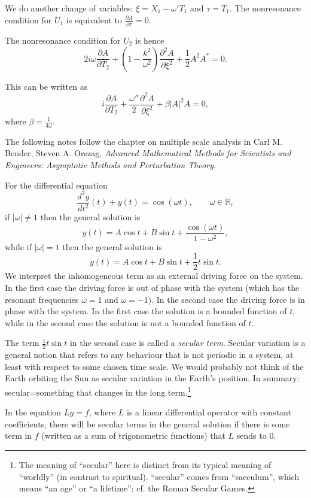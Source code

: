 \documentclass[11pt]{article}
\begin{document}
We do another change of variables: $\xi=X_1-\omega' T_1$ and $\tau=T_1$. The nonresonance condition for $U_1$ is equivalent to $\frac{\partial A}{\partial \tau}=0$.

The nonresonance condition for $U_2$ is hence 
\[
2i\omega \frac{\partial A}{\partial T_2}+(1-\frac{k^2}{\omega^2})\frac{\partial^2 A}{\partial \xi^2}
+\frac{1}{2}A^2A^*=0.
\]

This can be written as 
\[
i\frac{\partial A}{\partial T_2}+\frac{\omega''}{2} \frac{\partial^2 A}{\partial \xi^2}+\beta |A|^2 A=0,
\]
where $\beta=\frac{1}{4\omega}$.

The following notes follow the chapter on multiple scale analysis in Carl M. Bender, Steven A. Orszag, {\em Advanced Mathematical Methods for Scientists and Engineers: Asymptotic Methods and Perturbation Theory}. 

For the differential equation
\[
\frac{d^2 y}{dt^2}(t)+y(t)=\cos (\omega t), \qquad \omega \in \mathbb{R},
\]
if $|\omega| \neq 1$ then the general solution is
\[
y(t)=A\cos t+B\sin t +\frac{\cos(\omega t)}{1-\omega^2},
\]
while if $|\omega|=1$ then the general solution is
\[
y(t)=A\cos t+B\sin t +\frac{1}{2}t \sin t.
\]
We interpret the inhomogeneous term as an external driving force on the system. In the first case the driving force is out of phase with the system (which has the resonant frequencies $\omega=1$ and
$\omega=-1$). In the second case the driving force is in phase with the system. In the first case the solution is a bounded function of $t$, while in the second case the solution is not a bounded function of $t$. 

The term $\frac{1}{2}t \sin t$ in the second case is called a {\em secular term}. Secular variation is a general notion that refers to any behaviour that is not periodic in a system, at least with respect to some chosen time scale. We would probably not think of the Earth orbiting the Sun as secular variation in the Earth's position. In summary: secular=something that changes in the long term.\footnote{The meaning of ``secular'' here is distinct from its typical meaning of ``worldly'' (in contrast to spiritual).  ``secular'' comes from ``saeculum'', which means ``an age'' or ``a lifetime''; cf. the Roman Secular Games.}

In the equation $Ly=f$, where $L$ is a linear differential operator with constant coefficients, there will be secular terms in the general solution if there is some term in $f$ (written as a sum of trigonometric functions) that $L$ sends to 0.
\end{document}
